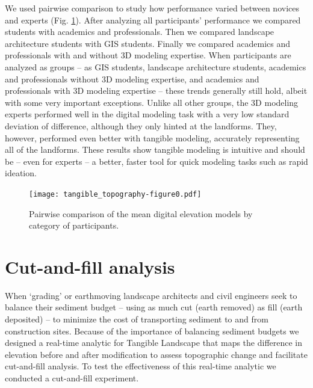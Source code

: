 \documentclass[Afour,sagev,times]{sagej} %
\begin{document}
We used pairwise comparison to study 
how performance varied between 
novices and experts (Fig. \ref{fig:comparison}).
After analyzing all participants' performance
we compared students with academics and professionals. 
Then we compared landscape architecture students with GIS students.
Finally we compared academics and professionals 
with and without 3D modeling expertise.
%
When participants are analyzed as groups 
-- as GIS students, landscape architecture students, 
academics and professionals without 3D modeling expertise, 
and academics and professionals with 3D modeling expertise -- 
these trends generally still hold, 
albeit with some very important exceptions.
%
Unlike all other groups, 
the 3D modeling experts performed well 
in the digital modeling task
with a very low standard deviation of difference, 
although they only hinted at the landforms. 
They, however, performed even better with tangible modeling,
accurately representing all of the landforms. 
%
These results show 
tangible modeling is intuitive 
and should be -- even for experts -- 
a better, faster tool 
for quick modeling tasks such as rapid ideation.


%

\begin{figure}[t]
\texttt{[image: tangible\_topography-figure0.pdf]}
\caption{Pairwise comparison of the mean digital elevation models 
by category of participants.}
\label{fig:comparison}
\end{figure}



\section{Cut-and-fill analysis}
When `grading' or earthmoving
landscape architects and civil engineers
seek to balance their sediment budget 
-- using as much cut (earth removed) 
as fill (earth deposited) --
to minimize the cost of transporting sediment 
to and from construction sites.
Because of the importance 
of balancing sediment budgets
we designed a real-time analytic 
for Tangible Landscape that 
maps the difference in elevation
before and after modification
to assess topographic change and
facilitate cut-and-fill analysis. 
To test the effectiveness of this real-time analytic
we conducted a cut-and-fill experiment.
\end{document}
